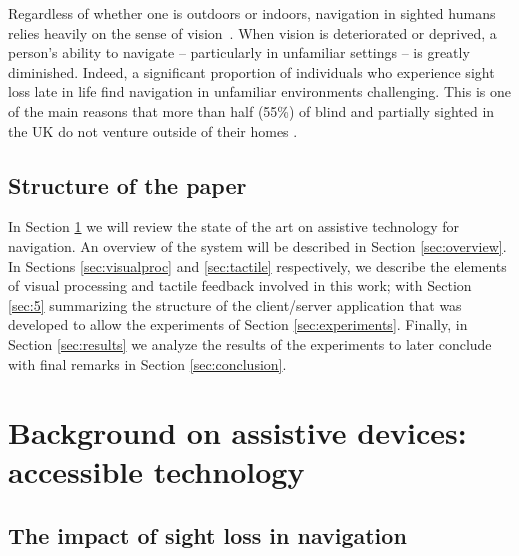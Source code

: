 Regardless of whether one is outdoors or indoors, navigation in sighted humans relies heavily on the sense of vision~\citep{kalia2008learning,tsuji2005landmarks}. When vision is deteriorated or deprived, a person's ability to navigate -- particularly in unfamiliar settings -- is greatly diminished. Indeed, a significant proportion of individuals who experience sight loss late in life find navigation in unfamiliar environments challenging. This is one of the main reasons that more than half (55\%) of blind and partially sighted in the UK do not venture outside of their homes \citep{Worsfold2010}.



\subsection{Structure of the paper}

In Section \ref{sec:2} we will review the state of the art on assistive technology for navigation. An overview of the system will be described in Section \ref{sec:overview}. In Sections \ref{sec:visualproc} and \ref{sec:tactile} respectively, we describe the elements of visual processing and tactile feedback involved in this work; with Section \ref{sec:5} summarizing the structure of the client/server application that was developed to allow the experiments of Section \ref{sec:experiments}. Finally, in Section \ref{sec:results} we analyze the results of the experiments to later conclude with final remarks in Section \ref{sec:conclusion}.

\section{Background on assistive devices: accessible technology}
\label{sec:2}

\subsection{The impact of sight loss in navigation}

